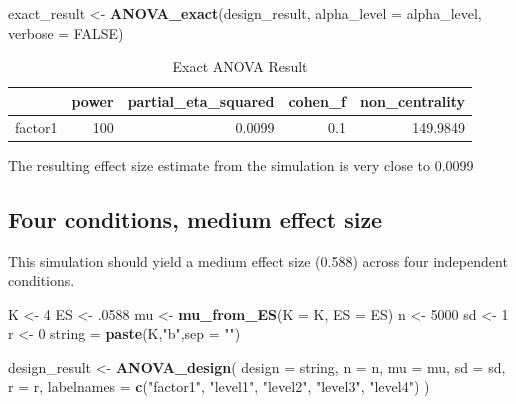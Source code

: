 \documentclass[]{book}
\newenvironment{Shaded}{\begin{snugshade}}{\end{snugshade}}
\newcommand{\DataTypeTok}[1]{\textcolor[rgb]{0.13,0.29,0.53}{#1}}
\newcommand{\DecValTok}[1]{\textcolor[rgb]{0.00,0.00,0.81}{#1}}
\newcommand{\FloatTok}[1]{\textcolor[rgb]{0.00,0.00,0.81}{#1}}
\newcommand{\KeywordTok}[1]{\textcolor[rgb]{0.13,0.29,0.53}{\textbf{#1}}}
\newcommand{\NormalTok}[1]{#1}
\newcommand{\OtherTok}[1]{\textcolor[rgb]{0.56,0.35,0.01}{#1}}
\newcommand{\StringTok}[1]{\textcolor[rgb]{0.31,0.60,0.02}{#1}}
\begin{document}
\begin{Shaded}
\begin{Highlighting}[]
\NormalTok{exact_result <-}\StringTok{ }\KeywordTok{ANOVA_exact}\NormalTok{(design_result,}
                            \DataTypeTok{alpha_level =}\NormalTok{ alpha_level,}
                            \DataTypeTok{verbose =} \OtherTok{FALSE}\NormalTok{)}
\end{Highlighting}
\end{Shaded}

\begin{table}[t]

\caption{\label{tab:unnamed-chunk-80}Exact ANOVA Result}
\centering
\begin{tabular}{l|r|r|r|r}
\hline
  & power & partial\_eta\_squared & cohen\_f & non\_centrality\\
\hline
factor1 & 100 & 0.0099 & 0.1 & 149.9849\\
\hline
\end{tabular}
\end{table}

The resulting effect size estimate from the simulation is very close to 0.0099

\hypertarget{four-conditions-medium-effect-size}{%
\subsection{Four conditions, medium effect size}\label{four-conditions-medium-effect-size}}

This simulation should yield a medium effect size (0.588) across four independent conditions.

\begin{Shaded}
\begin{Highlighting}[]
\NormalTok{K <-}\StringTok{ }\DecValTok{4}
\NormalTok{ES <-}\StringTok{ }\FloatTok{.0588}
\NormalTok{mu <-}\StringTok{ }\KeywordTok{mu_from_ES}\NormalTok{(}\DataTypeTok{K =}\NormalTok{ K, }\DataTypeTok{ES =}\NormalTok{ ES)}
\NormalTok{n <-}\StringTok{ }\DecValTok{5000}
\NormalTok{sd <-}\StringTok{ }\DecValTok{1}
\NormalTok{r <-}\StringTok{ }\DecValTok{0}
\NormalTok{string =}\StringTok{ }\KeywordTok{paste}\NormalTok{(K,}\StringTok{"b"}\NormalTok{,}\DataTypeTok{sep =} \StringTok{""}\NormalTok{)}
\end{Highlighting}
\end{Shaded}

\begin{Shaded}
\begin{Highlighting}[]
\NormalTok{design_result <-}\StringTok{ }\KeywordTok{ANOVA_design}\NormalTok{(}
  \DataTypeTok{design =}\NormalTok{ string,}
  \DataTypeTok{n =}\NormalTok{ n,}
  \DataTypeTok{mu =}\NormalTok{ mu,}
  \DataTypeTok{sd =}\NormalTok{ sd,}
  \DataTypeTok{r =}\NormalTok{ r,}
  \DataTypeTok{labelnames =} \KeywordTok{c}\NormalTok{(}\StringTok{"factor1"}\NormalTok{, }\StringTok{"level1"}\NormalTok{, }\StringTok{"level2"}\NormalTok{, }\StringTok{"level3"}\NormalTok{, }\StringTok{"level4"}\NormalTok{)}
\NormalTok{  )}
\end{Highlighting}
\end{Shaded}
\end{document}

